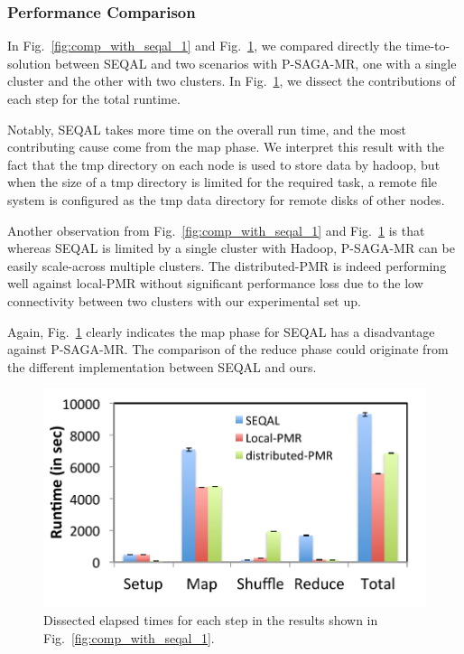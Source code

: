 \documentclass{sig-alternate}
\begin{document}
\subsubsection{Performance Comparison}
In Fig.~\ref{fig:comp_with_seqal_1} and Fig.~\ref{fig:comp_with_seqal_2}, we compared directly the time-to-solution between SEQAL and two scenarios with P-SAGA-MR, one with a single cluster and the other with two clusters.  In Fig.~\ref{fig:comp_with_seqal_2}, we dissect the contributions of each step for the total runtime.  

Notably, SEQAL takes more time on the overall run time, and the most contributing cause come from the map phase.  We interpret this result with the fact that the tmp directory on each node is used to store data by hadoop, but when the size of a tmp directory is limited for the required task, a remote file system is configured as  the tmp data directory for remote disks of other nodes.

Another observation from Fig.~\ref{fig:comp_with_seqal_1} and Fig.~\ref{fig:comp_with_seqal_2} is that whereas SEQAL is limited by a single cluster with Hadoop, P-SAGA-MR can be easily scale-across multiple clusters. The distributed-PMR is indeed performing well against local-PMR without significant performance loss due to the low connectivity between two clusters with our experimental set up.  

Again, Fig.~\ref{fig:comp_with_seqal_2} clearly indicates the map phase for SEQAL has a disadvantage against P-SAGA-MR.  The comparison of the reduce phase could originate from the different implementation between SEQAL and ours.

\begin{figure} 
 \centering
\includegraphics[scale=0.50]{figures/8GB_phasewisetimes.pdf}
\caption{\small  Dissected elapsed times for each step in the results shown in Fig.~\ref{fig:comp_with_seqal_1}.  }
  \label{fig:comp_with_seqal_2} 
\end{figure}
\end{document}
